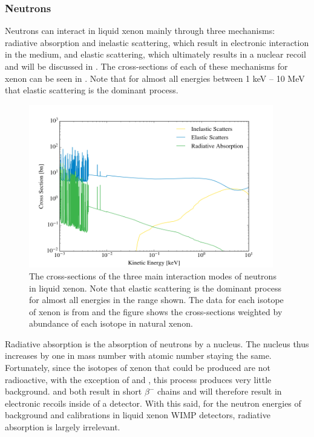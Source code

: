 \subsubsection{Neutrons}

Neutrons can interact in liquid xenon mainly through three mechanisms: radiative absorption and inelastic scattering, which result in electronic interaction in the medium, and elastic scattering, which ultimately results in a nuclear recoil and will be discussed in .   The cross-sections of each of these mechanisms for xenon can be seen in .  Note that for almost all energies between 1 keV -- 10 MeV that elastic scattering is the dominant process.


\begin{figure}[t]
	\centering
	\includegraphics[width=0.95\textwidth]{neutron_cross_sections}
	\caption{The cross-sections of the three main interaction modes of neutrons in liquid xenon.  Note that elastic scattering is the dominant process for almost all energies in the range shown.  The data for each isotope of xenon is from  and the figure shows the cross-sections weighted by abundance of each isotope in natural xenon.}
	\label{fig:neutron_cross_section}
\end{figure}


Radiative absorption is the absorption of neutrons by a nucleus.  The nucleus thus increases by one in mass number with atomic number staying the same.  Fortunately, since the isotopes of xenon that could be produced are not radioactive, with the exception of  and , this process produces very little background.   and  both result in short $\beta^-$ chains and will therefore result in electronic recoils inside of a detector.  With this said, for the neutron energies of background and calibrations in liquid xenon WIMP detectors, radiative absorption is largely irrelevant.

